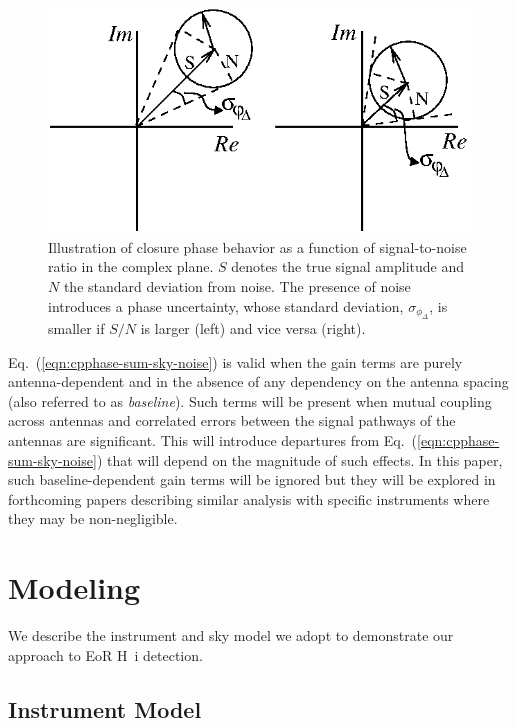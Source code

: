 \documentclass[
reprint,
superscriptaddress,
amsmath,
amssymb,
aps,
prd
]{revtex4-1}
\begin{document}
\begin{figure}[htb]
\includegraphics{phasor}%
\caption{Illustration of closure phase behavior as a function of signal-to-noise ratio in the complex plane. $S$ denotes the true signal amplitude and $N$ the standard deviation from noise. The presence of noise introduces a phase uncertainty, whose standard deviation, $\sigma_{\phi_\Delta}$, is smaller if $S/N$ is larger (left) and vice versa (right). \label{fig:cpphase-cartoon}}
\end{figure}

Eq.~(\ref{eqn:cpphase-sum-sky-noise}) is valid when the gain terms are purely antenna-dependent and in the absence of any dependency on the antenna spacing (also referred to as {\it baseline}). Such terms will be present when mutual coupling across antennas and correlated errors between the signal pathways of the antennas are significant. This will introduce departures from Eq.~(\ref{eqn:cpphase-sum-sky-noise}) that will depend on the magnitude of such effects. In this paper, such baseline-dependent gain terms will be ignored but they will be explored in forthcoming papers describing similar analysis with specific instruments where they may be non-negligible. 

\section{Modeling}\label{sec:modeling}

We describe the instrument and sky model we adopt to demonstrate our approach to EoR H~{\sc i} detection. 

\subsection{Instrument Model}\label{sec:instrument}
\end{document}

